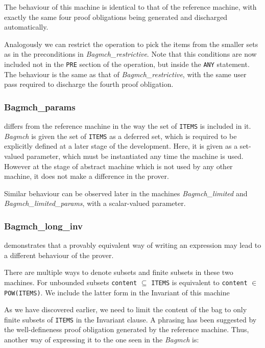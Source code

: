 \documentclass[11pt,journal]{IEEEtran}
\begin{document}
	The behaviour of this machine is identical to that of the reference machine, with exactly the same four proof obligations being generated and discharged automatically. 
	
	Analogously we can restrict the operation to pick the items from the smaller sets as in the preconditions in \emph{Bagmch\_restrictive}. Note that this conditions are now included not in the \texttt{PRE} section of the operation, but inside the \texttt{ANY} statement. The behaviour is the same as that of \emph{Bagmch\_restrictive}, with the same user pass required to discharge the fourth proof obligation.
	
	\subsubsection{Bagmch\_params} differs from the reference machine in the way the set of \texttt{ITEMS} is included in it. \emph{Bagmch} is given the set of \texttt{ITEMS} as a deferred set, which is required to be explicitly defined at a later stage of the development. Here, it is given as a set-valued parameter, which must be instantiated any time the machine is used.\cite{b-method} However at the stage of abstract machine which is not used by any other machine, it does not make a difference in the prover.
	
	Similar behaviour can be observed later in the machines \emph{Bagmch\_limited} and \emph{Bagmch\_limited\_params}, with a scalar-valued parameter.
	
	\subsubsection{Bagmch\_long\_inv} demonstrates that a provably equivalent way of writing an expression may lead to a different behaviour of the prover. 
	
	There are multiple ways to denote subsets and finite subsets in these two machines. For unbounded subsets \texttt{content} $\subseteq$ \texttt{ITEMS} is equivalent to \texttt{content} $\in$ \texttt{POW(ITEMS)}. We include the latter form in the Invariant of this machine
	
	As we have discovered earlier, we need to limit the content of the bag to only finite subsets of \texttt{ITEMS} in the Invariant clause. A phrasing has been suggested by the well-defineness proof obligation generated by the reference machine. Thus, another way of expressing it to the one seen in the \emph{Bagmch} is:
	
\end{document}
